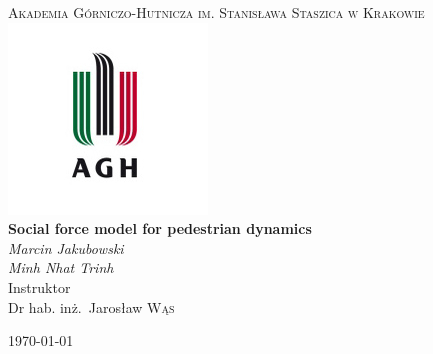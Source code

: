 \begin{titlepage}
	\centering
	{\scshape\LARGE Akademia Górniczo-Hutnicza im. Stanisława Staszica w Krakowie \\}
	\includegraphics{logoUniversity.jpg}\\
	\vspace{1cm}
	\vspace{1cm}
	\vspace{1cm}
	{\huge\bfseries Social force model for pedestrian dynamics\\}
	\vspace{2cm}
	{\Large\itshape 
		Marcin Jakubowski\\
		Minh Nhat Trinh\\
	}
	\vfill
	Instruktor\\
	Dr hab. inż.~Jarosław \textsc{Wąs} 
	\vfill

	{\large \today\\}
\end{titlepage}
